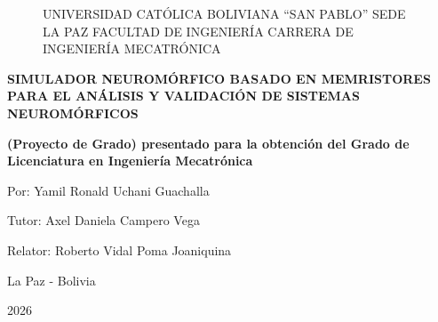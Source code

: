 \begin{center}
\begin{figure}
\centering%
\textsc{\large UNIVERSIDAD CATÓLICA BOLIVIANA ``SAN PABLO'' }
\textsc{\large SEDE LA PAZ}
\textsc{\large FACULTAD DE INGENIERÍA}
\textsc{\normalsize CARRERA DE INGENIERÍA MECATRÓNICA}
%
\end{figure}

\textbf{\large
SIMULADOR NEUROMÓRFICO BASADO EN MEMRISTORES PARA EL ANÁLISIS Y VALIDACIÓN DE SISTEMAS NEUROMÓRFICOS}

\thispagestyle{empty}
\vspace*{0.01cm}

\textbf{\large
(Proyecto de Grado) presentado para la obtención del Grado de Licenciatura en Ingeniería Mecatrónica}

\thispagestyle{empty}
\vspace*{0.01cm}

\normalsize
Por: Yamil Ronald Uchani Guachalla 

\thispagestyle{empty}
\vspace*{0.01cm}

\normalsize
Tutor: Axel Daniela Campero Vega\

\thispagestyle{empty}
\vspace*{0.01cm}

\normalsize
Relator: Roberto Vidal Poma Joaniquina

\vspace{1cm}
\normalsize
La Paz - Bolivia

\vspace{0.5cm}
\normalsize
2026

\end{center}

\newpage{\pagestyle{empty}\cleardoublepage}

\newpage

\newpage{\pagestyle{empty}\cleardoublepage} 

\newpage
\thispagestyle{empty} \textbf{}\normalsize

